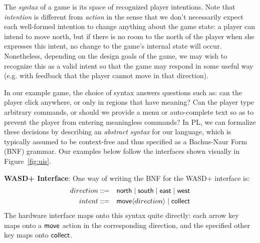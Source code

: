 % 
% 
%   

  The {\em syntax} of a game is its space of recognized player intentions.
  Note that {\em intention} is different from {\em action} in the sense
  that we don't necessarily expect each well-formed intention to change
  anything about the game state: a player can intend to move north, but if
  there is no room to the north of the player when she expresses this
  intent, no change to the game's internal state will occur. Nonetheless,
  depending on the design goals of the game, we may wish to recognize this
  as a valid intent so that the game may respond in some useful way (e.g.
  with feedback that the player cannot move in that direction).
  
  In our example game, the choice of syntax answers questions such as: can
  the player click anywhere, or only in regions that have meaning? Can the
  player type arbitrary commands, or should we provide a menu or
  auto-complete text so as to prevent the player from entering meaningless
  commands?  In PL, we can formalize these decisions by describing an {\em
  abstract syntax} for our language, which is typically assumed to be
  context-free and thus specified as a Bachus-Naur Form (BNF) grammar. Our
  examples below follow the interfaces shown visually in
  Figure~\ref{fig:uis}.
  
  \textbf{WASD+ Interface}:
  One way of writing the BNF for the WASD+ interface is:
  \begin{eqnarray*}
  direction &::=& \mathsf{north} \mid \mathsf{south} \mid \mathsf{east}
    \mid \mathsf{west} \\
  intent &::=& \mathsf{move} \langle direction \rangle \mid \mathsf{collect}
  \end{eqnarray*}
  The hardware interface maps onto this syntax quite directly:
  each arrow key maps onto a $\mathsf{move}$ action in the corresponding
  direction, and the specified other key maps onto $\mathsf{collect}$.

